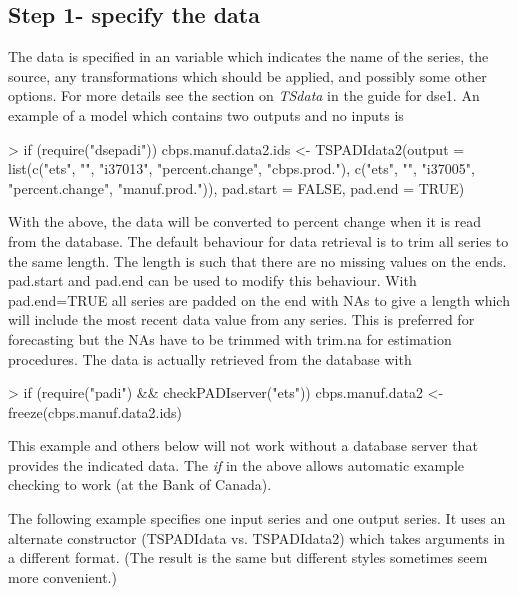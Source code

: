 \documentclass[english]{article}
\begin{document}
\subsection{Step 1- specify the data}


The data is specified in an variable which indicates the name of
the series, the source, any transformations which should be applied,
and possibly some other options. For more details see the section on
\emph{TSdata} in the guide for dse1.
An example of a model which contains two outputs and no inputs is

\begin{Schunk}
\begin{Sinput}
> if (require("dsepadi")) cbps.manuf.data2.ids <- TSPADIdata2(output = list(c("ets", 
      "", "i37013", "percent.change", "cbps.prod."), c("ets", "", 
      "i37005", "percent.change", "manuf.prod.")), pad.start = FALSE, 
      pad.end = TRUE)
\end{Sinput}
\end{Schunk}

With the above, the data will be converted to percent change when
it is read from the database. The default behaviour for data retrieval
is to trim all series to the same length. The length is such that
there are no missing values on the ends. pad.start and pad.end can
be used to modify this behaviour. With pad.end=TRUE all series are padded
on the end with NAs to give a length which will include the most recent
data value from any series. This is preferred for forecasting but
the NAs have to be trimmed with trim.na for estimation procedures.
The data is actually retrieved from the database with

\begin{Schunk}
\begin{Sinput}
> if (require("padi") && checkPADIserver("ets")) cbps.manuf.data2 <- freeze(cbps.manuf.data2.ids)
\end{Sinput}
\end{Schunk}

This example and others below will not work without a database server
that provides the indicated data. The \emph{if} in the above allows automatic
example checking to work (at the Bank of Canada).

The following example specifies one input series and one output series.
It uses an alternate constructor (TSPADIdata vs. TSPADIdata2) which
takes arguments in a different format. (The result is the same but
different styles sometimes seem more convenient.)
\end{document}
